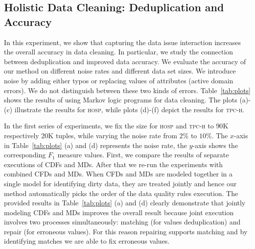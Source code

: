 \subsection{Holistic Data Cleaning: Deduplication and Accuracy}
\label{subsec:exp1}
In this experiment, we show that capturing the data issue interaction increases the overall accuracy in data cleaning. In particular, we study the connection between deduplication and improved data accuracy. We evaluate the accuracy of our method on different noise rates and different data set sizes. We introduce noise by adding either typos or replacing values of attributes (active domain errors). We do not distinguish between these two kinds of errors. Table~\ref{tab:plots} shows the results of using Markov logic programs for data cleaning. The plots (a)-(c) illustrate the results for \textsc{hosp}, while plots (d)-(f) depict the results for \textsc{tpc-h}. %

In the first series of experiments, we fix the size for \textsc{hosp} and \textsc{tpc-h} to $90$K respectively $20$K tuples, while varying the noise rate from $2\%$ to $10\%$. The $x$-axis in Table~\ref{tab:plots} (a) and (d) represents the noise rate, the $y$-axis shows the corresponding $F_1$ measure values. First, we compare the results of separate executions of CDFs and MDs. After that we re-run the experiments with combined CFDs and MDs. When CFDs and MDs are modeled together in a single model for identifying dirty data, they are treated jointly and hence our method automatically picks the order of the data quality rules execution. The provided results in Table~\ref{tab:plots} (a) and (d) clearly demonstrate that jointly modeling CDFs and MDs improves the overall result because joint execution involves two processes simultaneously: matching (for values deduplication) and repair (for erroneous values). For this reason repairing supports matching and by identifying matches we are able to fix erroneous values.

